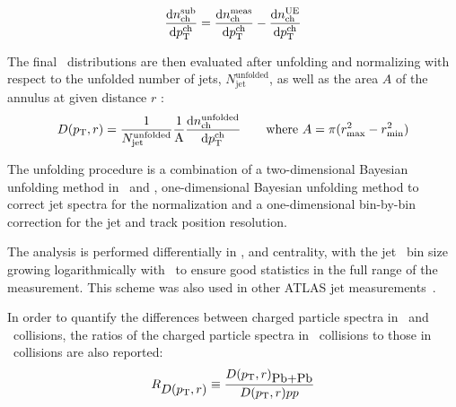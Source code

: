 \begin{equation}
\frac{\text{d}n^{\text{sub}}_{\text{ch}}}{\text{d}\mbox{$p_{{\mathrm{T}}}^{\mathrm{ch}}$}} = \frac{\text{d}n^{\text{meas}}_{\text{ch}}}{\text{d}\mbox{$p_{{\mathrm{T}}}^{\mathrm{ch}}$}} - \frac{\text{d}n^{\text{UE}}_{\text{ch}}}{\text{d}\mbox{$p_{{\mathrm{T}}}^{\mathrm{ch}}$}}
\end{equation}

The final \Dptr\ distributions are then evaluated after unfolding and normalizing with respect to the unfolded number of jets, $N_{\text{jet}}^{\text{unfolded}}$, as well as the area $A$ of the annulus at given distance $r$ :
\begin{equation}
\mbox{$D( \mbox{$p_{\mathrm{T}}$}, r)$} = \frac{1}{N_{\text{jet}}^{\text{unfolded}}} \frac{1}{\text{A}} \frac{\text{d}n^{\text{unfolded}}_{\text{ch}}}{\text{d}\mbox{$p_{{\mathrm{T}}}^{\mathrm{ch}}$}} \quad \quad \text{where } A = \pi (r_{\text{max}}^2 - r_{\text{min}}^2)
\end{equation}

The unfolding procedure is a combination of a two-dimensional Bayesian unfolding method in \ptjet\ and \pttrk, one-dimensional Bayesian unfolding method to correct jet spectra for the normalization and a one-dimensional bin-by-bin correction for the jet and track position resolution.


The analysis is performed differentially in \ptjet, and centrality, with the jet \pt\ bin size growing logarithmically with \ptjet\ to ensure good statistics in the full range of the measurement.
This scheme was also used in other ATLAS jet measurements~\cite{ATLAS276FFConf}.


In order to quantify the differences between charged particle spectra in \pbpb\ and \pp\  collisions, the ratios of the charged particle spectra in \pbpb\ collisions to those in \pp\ collisions are also reported:
\begin{equation}
   R_{\mbox{$D( \mbox{$p_{\mathrm{T}}$}, r)$}} \equiv \frac{\mbox{$D( \mbox{$p_{\mathrm{T}}$}, r)$}_{\mbox{Pb+Pb}}}{\mbox{$D( \mbox{$p_{\mathrm{T}}$}, r)$}{\mbox{$pp$}}}
\end{equation}


